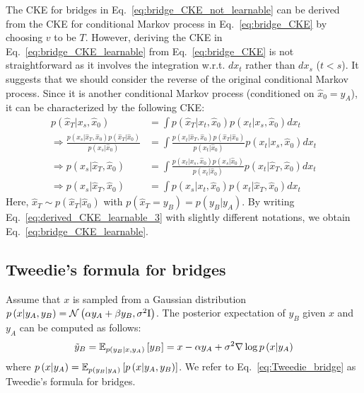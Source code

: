 The CKE for bridges in Eq.~\ref{eq:bridge_CKE_not_learnable} can
be derived from the CKE for conditional Markov process in Eq.~\ref{eq:bridge_CKE}
by choosing $v$ to be $T$. However, deriving the CKE in Eq.~\ref{eq:bridge_CKE_learnable}
from Eq.~\ref{eq:bridge_CKE} is not straightforward as it involves
the integration w.r.t. $dx_{t}$ rather than $dx_{s}$ ($t<s$). It
suggests that we should consider the reverse of the original conditional
Markov process. Since it is another conditional Markov process (conditioned
on $\hat{x}_{0}=y_{A}$), it can be characterized by the following
CKE:
\begin{align}
p\left(\hat{x}_{T}|x_{s},\hat{x}_{0}\right) & =\int p\left(\hat{x}_{T}|x_{t},\hat{x}_{0}\right)p\left(x_{t}|x_{s},\hat{x}_{0}\right)dx_{t}\label{eq:derived_CKE_learnable_1}\\
\Rightarrow\frac{p\left(x_{s}|\hat{x}_{T},\hat{x}_{0}\right)p\left(\hat{x}_{T}|\hat{x}_{0}\right)}{p\left(x_{s}|\hat{x}_{0}\right)} & =\int\frac{p\left(x_{t}|\hat{x}_{T},\hat{x}_{0}\right)p\left(\hat{x}_{T}|\hat{x}_{0}\right)}{p\left(x_{t}|\hat{x}_{0}\right)}p\left(x_{t}|x_{s},\hat{x}_{0}\right)dx_{t}\label{eq:derived_CKE_learnable_2}\\
\Rightarrow p\left(x_{s}|\hat{x}_{T},\hat{x}_{0}\right) & =\int\frac{p\left(x_{t}|x_{s},\hat{x}_{0}\right)p\left(x_{s}|\hat{x}_{0}\right)}{p\left(x_{t}|\hat{x}_{0}\right)}p\left(x_{t}|\hat{x}_{T},\hat{x}_{0}\right)dx_{t}\label{eq:derived_CKE_learnable_3}\\
\Rightarrow p\left(x_{s}|\hat{x}_{T},\hat{x}_{0}\right) & =\int p\left(x_{s}|x_{t},\hat{x}_{0}\right)p\left(x_{t}|\hat{x}_{T},\hat{x}_{0}\right)dx_{t}\label{eq:derived_CKE_learnable_4}
\end{align}
Here, $\hat{x}_{T}\sim p\left(\hat{x}_{T}|\hat{x}_{0}\right)$ with
$p\left(\hat{x}_{T}=y_{B}\right)=p\left(y_{B}|y_{A}\right)$. By writing
Eq.~\ref{eq:derived_CKE_learnable_3} with slightly different notations,
we obtain Eq.~\ref{eq:bridge_CKE_learnable}.

\subsection{Tweedie's formula for bridges\label{subsec:Tweedie's-formula-for-bridges}}

Assume that $x$ is sampled from a Gaussian distribution $p\left(x|y_{A},y_{B}\right)=\mathcal{N}\left(\alpha y_{A}+\beta y_{B},\sigma^{2}\mathrm{I}\right)$.
The posterior expectation of $y_{B}$ given $x$ and $y_{A}$ can
be computed as follows:
\begin{equation}
\tilde{y}_{B}=\mathbb{E}_{p\left(y_{B}|x,y_{A}\right)}\left[y_{B}\right]=x-\alpha y_{A}+\sigma^{2}\nabla\log p\left(x|y_{A}\right)\label{eq:Tweedie_bridge}
\end{equation}
where $p\left(x|y_{A}\right)=\mathbb{E}_{p\left(y_{B}|y_{A}\right)}\left[p\left(x|y_{A},y_{B}\right)\right]$.
We refer to Eq.~\ref{eq:Tweedie_bridge} as Tweedie's formula for
bridges.

